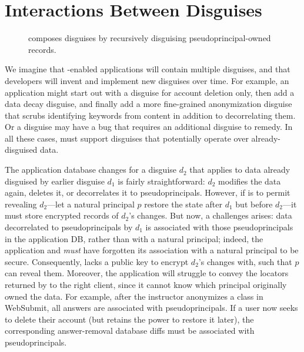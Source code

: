 \section{Interactions Between Disguises}
\label{s:composition}

\begin{figure}[t]
    \centering
    \caption{\sys composes disguises by recursively disguising
             pseudoprincipal-owned records.}
    \label{f:recursive}
\end{figure}

%
We imagine that \sys-enabled applications will contain multiple
disguises, and that developers will invent and implement new disguises
over time.
%
For example, an application might start out with a disguise for account
deletion only, then add a data decay disguise, and finally add a more
fine-grained anonymization disguise that scrubs identifying keywords
from content in addition to decorrelating them.
%
Or a disguise may have a bug that requires an additional disguise
to remedy.
%
In all these cases, \sys must support disguises that potentially
operate over already-disguised data.
%

%
The application database changes for a disguise $d_2$ that applies
to data already disguised by earlier disguise $d_1$ is fairly
straightforward: $d_2$ modifies the data again, deletes it, or
decorrelates it to pseudoprincipals.
%
However, if \sys is to permit revealing $d_2$---\ie let a natural
principal $p$ restore the state after $d_1$ but before $d_2$---it must
store encrypted records of $d_2$'s changes.
%
But now, a challenges arises: data decorrelated to pseudoprincipals
by $d_1$ is associated with those pseudoprincipals in the application
DB, rather than with a natural principal; indeed, the application
and \sys \emph{must} have forgotten its association with a natural
principal to be secure.
%
Consequently, \sys lacks a public key to encrypt $d_2$'s changes
with, such that $p$ can reveal them.
%
Moreover, the application will struggle to convey the locators returned
by \sys to the right client, since it cannot know which principal
originally owned the data.
%
For example, after the instructor anonymizes a class in WebSubmit, all
answers are associated with pseudoprincipals.
%
If a user now seeks to delete their account (but retains the power to
restore it later), the corresponding answer-removal database diffs
must be associated with pseudoprincipals.
%
%

